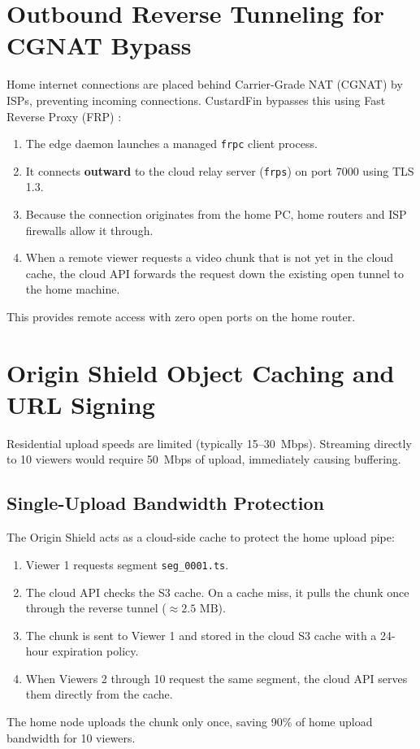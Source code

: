 \section{Outbound Reverse Tunneling for CGNAT Bypass}
\label{sec:feat_cgnat_tunnel}

Home internet connections are placed behind Carrier-Grade NAT (CGNAT) by ISPs, preventing incoming connections. CustardFin bypasses this using Fast Reverse Proxy (FRP) \cite{fatedier2024frp}:
\begin{enumerate}
    \item The edge daemon launches a managed \texttt{frpc} client process.
    \item It connects \textbf{outward} to the cloud relay server (\texttt{frps}) on port 7000 using TLS 1.3.
    \item Because the connection originates from the home PC, home routers and ISP firewalls allow it through.
    \item When a remote viewer requests a video chunk that is not yet in the cloud cache, the cloud API forwards the request down the existing open tunnel to the home machine.
\end{enumerate}
This provides remote access with zero open ports on the home router.

\section{Origin Shield Object Caching and URL Signing}
\label{sec:feat_origin_shield}

Residential upload speeds are limited (typically 15--30~Mbps). Streaming directly to 10 viewers would require 50~Mbps of upload, immediately causing buffering.

\subsection{Single-Upload Bandwidth Protection}
The Origin Shield acts as a cloud-side cache to protect the home upload pipe:
\begin{enumerate}
    \item Viewer 1 requests segment \texttt{seg\_0001.ts}.
    \item The cloud API checks the S3 cache. On a cache miss, it pulls the chunk once through the reverse tunnel ($\approx 2.5\text{ MB}$).
    \item The chunk is sent to Viewer 1 and stored in the cloud S3 cache with a 24-hour expiration policy.
    \item When Viewers 2 through 10 request the same segment, the cloud API serves them directly from the cache.
\end{enumerate}
The home node uploads the chunk only once, saving 90\% of home upload bandwidth for 10 viewers.

